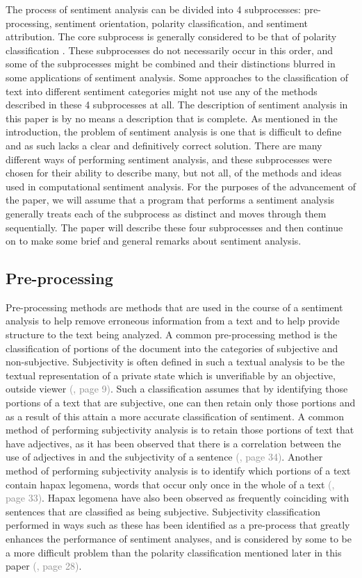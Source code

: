 \documentclass[letterpaper, 10 pt, conference]{ieeeconf}
\begin{document}
The process of sentiment analysis can be divided into 4 subprocesses: pre-processing, sentiment orientation, polarity classification, and sentiment attribution. The core subprocess is generally considered to be that of polarity classification \textcolor{gray}{\cite{PangLee,RaviRavi}}. These subprocesses do not necessarily occur in this order, and some of the subprocesses might be combined and their distinctions blurred in some applications of sentiment analysis. Some approaches to the classification of text into different sentiment categories might not use any of the methods described in these 4 subprocesses at all. The description of sentiment analysis in this paper is by no means a description that is complete. As mentioned in the introduction, the problem of sentiment analysis is one that is difficult to define and as such lacks a clear and definitively correct solution. There are many different ways of performing sentiment analysis, and these subprocesses were chosen for their ability to describe many, but not all, of the methods and ideas used in computational sentiment analysis. For the purposes of the advancement of the paper, we will assume that a program that performs a sentiment analysis generally treats each of the subprocess as distinct and moves through them sequentially. The paper will describe these four subprocesses and then continue on to make some brief and general remarks about sentiment analysis.

\subsection{Pre-processing} Pre-processing methods are methods that are used in the course of a sentiment analysis to help remove erroneous information from a text and to help provide structure to the text being analyzed. A common pre-processing method is the classification of portions of the document into the categories of subjective and non-subjective. Subjectivity is often defined in such a textual analysis to be the textual representation of a private state which is unverifiable by an objective, outside viewer \textcolor{gray}{(\cite{PangLee}, page 9)}. Such a classification assumes that by identifying those portions of a text that are subjective, one can then retain only those portions and as a result of this attain a more accurate classification of sentiment. A common method of performing subjectivity analysis is to retain those portions of text that have adjectives, as it has been observed that there is a correlation between the use of adjectives in and the subjectivity of a sentence \textcolor{gray}{(\cite{PangLee}, page 34)}. Another method of performing subjectivity analysis is to identify which portions of a text contain hapax legomena, words that occur only once in the whole of a text \textcolor{gray}{(\cite{PangLee}, page 33)}. Hapax legomena have also been observed as frequently coinciding with sentences that are classified as being subjective. Subjectivity classification performed in ways such as these has been identified as a pre-process that greatly enhances the performance of sentiment analyses, and is considered by some to be a more difficult problem than the polarity classification mentioned later in this paper \textcolor{gray}{(\cite{PangLee}, page 28)}.
\end{document}
